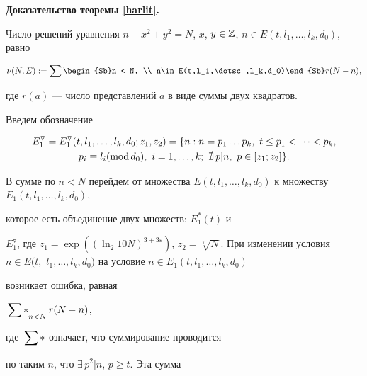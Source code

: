 {\bf Доказательство теоремы \ref{harlit}.}


Число решений уравнения $n + x^2 + y^2 = N$, $x$, $y


\in \Bbb Z$, $n\in E(t,l_1,\dotsc,l_k,d_0)$, равно


$$


\nu(N,E) := \sum\begin{Sb}n < N, \\ n\in E(t,l_1,\dotsc,l_k,d_0)\end{Sb}


r(N-n),


$$


где $r(a)$ --- число представлений $a$ в виде суммы двух квадратов.





Введем обозначение


\begin{multline*}


E^\triangledown_1=E^\triangledown_1(t,l_1,\dotsc,l_k,d_0;z_1,z_2)


= \{n: n = p_1 \dotsc p_k, \ t \le p_1 < \dotsb < p_k,\\


%


p_i \equiv l_i (\Mod d_0), \ i=1, \dotsc, k; \ \nexists


\, p|n, \ p \in [z_1;z_2] \}.


\end{multline*}





В сумме по $n < N$ перейдем от множества $E(t, l_1,


\dotsc, l_k, d_0)$ к множеству $E_1(t, l_1, \dotsc, l_k, d_0)$,


которое есть объединение двух множеств: $E^*_1 (t)$ и


$E^\triangledown_1$, где $z_1


= \exp ( (\ln_2 10 N)^{3 + 3 \varepsilon} )$, $z_2 =


\sqrt[7]N$. При изменении условия $n \in E(t,$ $l_1, \dotsc, l_k,


d_0)$ на условие $n\in E_1(t,l_1,\dotsc,l_k,d_0)$


возникает ошибка, равная


$\sideset{}{*}\sum_{n <N} r(N-n)$,


где $\sideset{}{*}\sum$ означает, что суммирование проводится


по таким $n$, что $\exists \, p^2 | n$, $p \ge t$. Эта сумма


